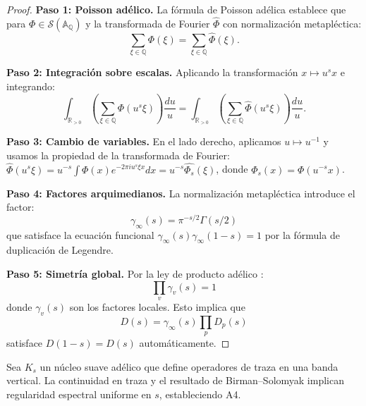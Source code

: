\begin{proof}
\textbf{Paso 1: Poisson adélico.} La fórmula de Poisson adélica \cite{Weil1964} establece que para 
$\Phi \in \mathcal{S}(\mathbb{A}_\mathbb{Q})$ y la transformada de Fourier $\widehat{\Phi}$ con normalización metapléctica:
$$\sum_{\xi \in \mathbb{Q}} \Phi(\xi) = \sum_{\xi \in \mathbb{Q}} \widehat{\Phi}(\xi).$$

\textbf{Paso 2: Integración sobre escalas.} Aplicando la transformación $x \mapsto u^s x$ e integrando:
$$\int_{\mathbb{R}_{>0}} \left(\sum_{\xi \in \mathbb{Q}} \Phi(u^s \xi)\right) \frac{du}{u} = \int_{\mathbb{R}_{>0}} \left(\sum_{\xi \in \mathbb{Q}} \widehat{\Phi}(u^s \xi)\right) \frac{du}{u}.$$

\textbf{Paso 3: Cambio de variables.} En el lado derecho, aplicamos $u \mapsto u^{-1}$ y usamos la propiedad de la transformada de Fourier:
$\widehat{\Phi}(u^s \xi) = u^{-s} \int \Phi(x) e^{-2\pi i u^s \xi x} dx = u^{-s} \widehat{\Phi_s}(\xi)$, donde $\Phi_s(x) = \Phi(u^{-s} x)$.

\textbf{Paso 4: Factores arquimedianos.} La normalización metapléctica introduce el factor:
$$\gamma_\infty(s) = \pi^{-s/2}\Gamma(s/2)$$
que satisface la ecuación funcional $\gamma_\infty(s)\gamma_\infty(1-s) = 1$ por la fórmula de duplicación de Legendre.

\textbf{Paso 5: Simetría global.} Por la ley de producto adélico \cite{Weil1964}:
$$\prod_v \gamma_v(s) = 1$$
donde $\gamma_v(s)$ son los factores locales. Esto implica que 
$$D(s) = \gamma_\infty(s) \prod_p D_p(s)$$
satisface $D(1-s) = D(s)$ automáticamente.
\end{proof}

\begin{lemma}
Sea $K_s$ un núcleo suave adélico que define operadores de traza en una banda vertical.
La continuidad en traza y el resultado de Birman--Solomyak implican regularidad
espectral uniforme en $s$, estableciendo A4.
\end{lemma}

